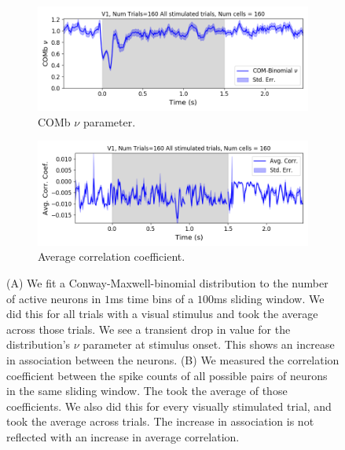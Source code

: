   \begin{figure}[h]
    \begin{subfigure}[h]{\linewidth}
      \includegraphics[width=\linewidth]{figures/conway_maxwell/v1_1ms_comb_nu_all_stimulated_trials.png}
      \caption{COMb $\nu$ parameter.}
      \label{fig:comb_nu_parameter}
    \end{subfigure}
    \begin{subfigure}[h]{\linewidth}
      \includegraphics[width=\linewidth]{figures/conway_maxwell/v1_1ms_corr_avg_all_stimulated_trials.png}
      \caption{Average correlation coefficient.}
      \label{fig:avg_corr_coef}
    \end{subfigure}
    \caption{(A) We fit a Conway-Maxwell-binomial distribution to the number of active neurons in $1$ms time bins of a $100$ms sliding window. We did this for all trials with a visual stimulus and took the average across those trials. We see a transient drop in value for the distribution's $\nu$ parameter at stimulus onset. This shows an increase in association between the neurons. (B) We measured the correlation coefficient between the spike counts of all possible pairs of neurons in the same sliding window. The took the average of those coefficients. We also did this for every visually stimulated trial, and took the average across trials. The increase in association is not reflected with an increase in average correlation.}
    \label{fig:comb_nu_and_corr}
  \end{figure}

